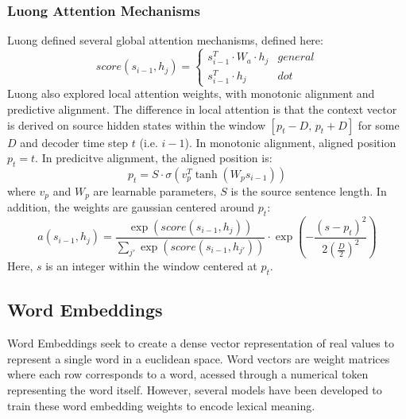 \subsubsection{Luong Attention Mechanisms}
Luong defined several global attention mechanisms, defined here:
\begin{equation}
  score(s_{i-1}, h_j) =
    \begin{cases}
      s_{i-1}^T \cdot W_a \cdot h_j & general \\
      s_{i-1}^T \cdot h_j & dot
    \end{cases}
\end{equation}
Luong also explored local attention weights, with monotonic alignment and
predictive alignment. The difference in local attention is that the
context vector is derived on source hidden states within the window
$\left[p_t - D , \, p_t + D\right]$ for some $D$ and decoder time step $t$ (i.e. $i-1$).
In monotonic alignment, aligned position $p_t=t$.
In predicitve alignment, the aligned position is:
\begin{equation}
  p_t = S \cdot \sigma \left( v_p^T \tanh \left( W_p s_{i-1} \right) \right)
\end{equation}
where $v_p$ and $W_p$ are learnable parameters,
$S$ is the source sentence length. In addition, the weights are gaussian centered
around $p_t$:
\begin{equation}
  a(s_{i-1}, h_j) = \frac{\exp(score(s_{i-1}, h_j))}{\sum_{j'} \exp(score(s_{i-1}, h_{j'}))} \cdot \exp\left(-\frac{(s-p_t)^2}{2\left(\frac{D}{2}\right)^2}\right)
\end{equation}
Here, $s$ is an integer within the window centered at $p_t$.


\subsection{Word Embeddings}
Word Embeddings seek to create a dense vector representation of real values
to represent a single word in a euclidean space. Word vectors are weight matrices
where each row corresponds to a word, acessed through a numerical token representing
the word itself. However, several models have been developed to train these
word embedding weights to encode lexical meaning.
